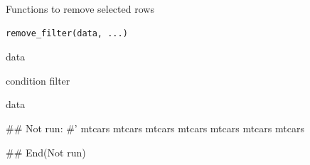 \documentclass[a4paper]{book}
\begin{document}
%
\begin{Description}
Functions to remove selected rows
\end{Description}
%
\begin{Usage}
\begin{verbatim}
remove_filter(data, ...)
\end{verbatim}
\end{Usage}
%
\begin{Arguments}
\begin{ldescription}
\item[\code{data}] data

\item[\code{...}] condition filter
\end{ldescription}
\end{Arguments}
%
\begin{Value}
data
\end{Value}
%
\begin{Examples}
\begin{ExampleCode}

\#\# Not run: 
#'
mtcars %
mtcars %
mtcars %
mtcars %
mtcars %
mtcars %
mtcars %

## End(Not run)

\end{ExampleCode}
\end{Examples}
\end{document}
